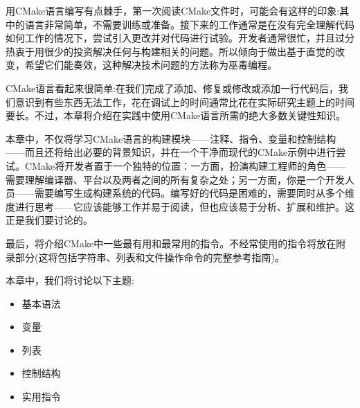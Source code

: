 用CMake语言编写有点棘手，第一次阅读CMake文件时，可能会有这样的印象:其中的语言非常简单，不需要训练或准备。接下来的工作通常是在没有完全理解代码如何工作的情况下，尝试引入更改并对代码进行试验。开发者通常很忙，并且过分热衷于用很少的投资解决任何与构建相关的问题。所以倾向于做出基于直觉的改变，希望它们能奏效，这种解决技术问题的方法称为巫毒编程。

CMake语言看起来很简单:在我们完成了添加、修复或修改或添加一行代码后，我们意识到有些东西无法工作，花在调试上的时间通常比花在实际研究主题上的时间要长。不过，本章将介绍在实践中使用CMake语言所需的绝大多数关键性知识。

本章中，不仅将学习CMake语言的构建模块——注释、指令、变量和控制结构——而且还将给出必要的背景知识，并在一个干净而现代的CMake示例中进行尝试。CMake将开发者置于一个独特的位置：一方面，扮演构建工程师的角色——需要理解编译器、平台以及两者之间的所有复杂之处；另一方面，你是一个开发人员——需要编写生成构建系统的代码。编写好的代码是困难的，需要同时从多个维度进行思考——它应该能够工作并易于阅读，但也应该易于分析、扩展和维护。这正是我们要讨论的。

最后，将介绍CMake中一些最有用和最常用的指令。不经常使用的指令将放在附录部分(这将包括字符串、列表和文件操作命令的完整参考指南)。

本章中，我们将讨论以下主题:

\begin{itemize}
\item 
基本语法

\item 
变量

\item 
列表

\item 
控制结构

\item 
实用指令
\end{itemize}